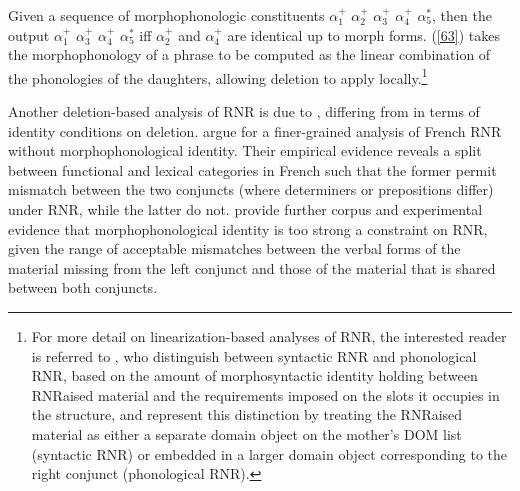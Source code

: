 \documentclass[output=paper
	        ,collection
	        ,collectionchapter
 	        ,biblatex
                ,babelshorthands
                ,newtxmath
                ,draftmode
                ,colorlinks, citecolor=brown
]{langscibook}
\begin{document}
{Given a sequence of morphophonologic constituents $\alpha_{1}^{+}$ $\alpha_{2}^{+}$ $\alpha_{3}^{+}$ $\alpha_{4}^{+}$ $\alpha_{5}^{*}$, then the output
$\alpha_{1}^{+}$ $\alpha_{3}^{+}$ $\alpha_{4}^{+}$ $\alpha_{5}^{*}$
iff $\alpha_{2}^{+}$ and $\alpha_{4}^{+}$ are identical up to morph forms.
\z
(\ref{63}) takes the morphophonology of a phrase to be computed as the linear combination of the phonologies of the daughters, allowing deletion to apply locally.\footnote{For more detail on linearization-based analyses of RNR, the interested reader is referred to \citet{Yatabe2001, Yatabe2012}, who distinguish between syntactic RNR and phonological RNR, based on the amount of morphosyntactic identity holding between RNRaised material and the requirements imposed on the slots it occupies in the structure, and represent this distinction by treating the RNRaised material as either a separate domain object on the mother's DOM list (syntactic RNR) or embedded in a larger domain object corresponding to the right conjunct (phonological RNR).}



\iffalse{
\citeauthor{Chaves2014}' (\citeyear[874]{Chaves2014}) constraint licensing true RNR is given in \ref{bpd}. It permits the M(orpho)P(honology) feature of the mother to contain only one instance (represented as $L_{3}$ in (\ref{63})) of the two morphophonologically identical sequences [FORM $F_{1}$], \ldots, [FORM $F_{n}$] present in the daughters; the leftmost of these sequences undergoes deletion. The final list in the mother, $L_{4}$, may be empty or nonempty, depending on whether RNRaised material is discontinuous.
%



\ea
\label{bpd}
Backward periphery deletion construction:\\
\avmtmp{\small
[\type*{phrase}
  mp $L_{1}$:\type{ne-list} $\bigcirc L_{2}$:\type{ne-list} $\bigcirc L_{3} \bigcirc L_{4}$ & ]
} $\to$
\avmtmp{
 [ \type*{phrase}
    mp $L_{1} \bigcirc$ < [ form $F_{1}$ ], \ldots, [ form $F_{n}$ ] > $\bigcirc L_{2} \bigcirc L_{3}:$%
     <[ form $F_{1}$ ], \ldots, [form $F_{n}$ ] > $\bigcirc L_{4}$ & ]
}
\z
}\fi

Another deletion-based analysis of RNR is due to \citep{Abeille2016, Shiraishi2019}, differing from \citet{Chaves2014} in terms of identity conditions on deletion. \citet{Abeille2016} argue for a finer-grained analysis of French RNR without morphophonological identity. Their empirical evidence reveals a split between functional and lexical categories in French such that the former permit mismatch between the two conjuncts (where determiners or prepositions differ) under RNR, while the latter do not. \citet{Shiraishi2019} provide further corpus and experimental evidence that morphophonological identity is too strong a constraint on RNR, given the range of acceptable mismatches between the verbal forms of the material missing from the left conjunct and those of the material that is shared between both conjuncts.

}
\end{document}
